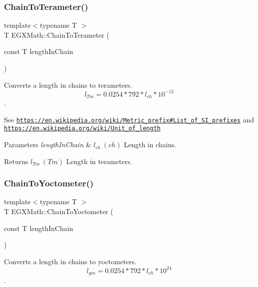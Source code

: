 \subsubsection{\texorpdfstring{Chain\+To\+Terameter()}{ChainToTerameter()}}
{\footnotesize\ttfamily template$<$typename T $>$ \\
T E\+G\+X\+Math\+::\+Chain\+To\+Terameter (\begin{DoxyParamCaption}\item[{const T}]{length\+In\+Chain }\end{DoxyParamCaption})}



Converts a length in chains to terameters. \[ l_{Tm}=0.0254 * 792 * l_{ch} * 10^{-12} \]. 

See \href{https://en.wikipedia.org/wiki/Metric_prefix#List_of_SI_prefixes}{\tt https\+://en.\+wikipedia.\+org/wiki/\+Metric\+\_\+prefix\#\+List\+\_\+of\+\_\+\+S\+I\+\_\+prefixes} and \href{https://en.wikipedia.org/wiki/Unit_of_length}{\tt https\+://en.\+wikipedia.\+org/wiki/\+Unit\+\_\+of\+\_\+length} 
\begin{DoxyParams}{Parameters}
{\em length\+In\+Chain} & $ l_{ch}\ (ch)$ Length in chains. \\
\hline
\end{DoxyParams}
\begin{DoxyReturn}{Returns}
$ l_{Tm}\ (Tm)$ Length in terameters. 
\end{DoxyReturn}
\mbox{\label{group___e_g_x_math-_conversions-_length_conversions-_imperial-_chain-_s_i_gafcc220586dd2018bb921f109efa11d06}} 
\subsubsection{\texorpdfstring{Chain\+To\+Yoctometer()}{ChainToYoctometer()}}
{\footnotesize\ttfamily template$<$typename T $>$ \\
T E\+G\+X\+Math\+::\+Chain\+To\+Yoctometer (\begin{DoxyParamCaption}\item[{const T}]{length\+In\+Chain }\end{DoxyParamCaption})}



Converts a length in chains to yoctometers. \[ l_{ym}=0.0254 * 792 * l_{ch} * 10^{24} \]. 

